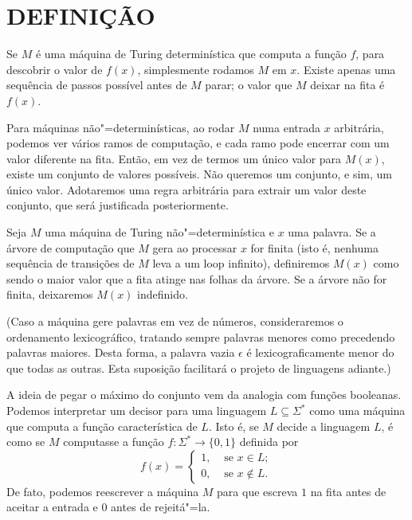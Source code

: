 \section{DEFINIÇÃO}

Se $M$ é uma máquina de Turing determinística que computa a função $f$,
para descobrir o valor de $f(x)$,
simplesmente rodamos $M$ em $x$.
Existe apenas uma sequência de passos possível antes de $M$ parar;
o valor que $M$ deixar na fita é $f(x)$.

Para máquinas não"=determinísticas,
ao rodar $M$ numa entrada $x$ arbitrária,
podemos ver vários ramos de computação,
e cada ramo pode encerrar com um valor diferente na fita.
Então, em vez de termos um único valor para $M(x)$,
existe um conjunto de valores possíveis.
Não queremos um conjunto, e sim, um único valor.
Adotaremos uma regra arbitrária para extrair um valor deste conjunto,
que será justificada posteriormente.

\begin{definition}[Função não"=determinística\footnotemark]
    \label{def:nondeterministic_function}
    Seja $M$
    uma máquina de Turing não"=determinística
    e $x$ uma palavra.
    Se a árvore de computação que $M$ gera ao processar $x$ for finita
    (isto é, nenhuma sequência de transições de $M$ leva a um loop infinito),
    definiremos $M(x)$ como sendo o maior valor que a fita atinge
    nas folhas da árvore.
    Se a árvore não for finita, deixaremos $M(x)$ indefinido.

    (Caso a máquina gere palavras em vez de números,
    consideraremos o ordenamento lexicográfico,
    tratando sempre palavras menores como precedendo palavras maiores.
    Desta forma, a palavra vazia $\epsilon$
    é lexicograficamente menor do que todas as outras.
    Esta suposição facilitará o projeto de linguagens adiante.)
\end{definition}

A ideia de pegar o máximo do conjunto vem da analogia com funções booleanas.
Podemos interpretar um decisor para uma linguagem $L \subseteq \Sigma^*$
como uma máquina que computa a função característica de $L$.
Isto é,
se $M$ decide a linguagem $L$,
é como se $M$ computasse a função $f : \Sigma^* \rightarrow \{0, 1\}$
definida por
\begin{equation*}
    f(x) =
    \begin{cases}
        1,& \text{ se } x \in L; \\
        0,& \text{ se } x \notin L.
    \end{cases}
\end{equation*}
De fato, podemos reescrever a máquina $M$
para que escreva $1$ na fita antes de aceitar a entrada
e $0$ antes de rejeitá"=la.

